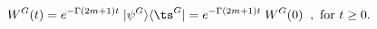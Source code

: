 \begin{equation}
W^G (t) = e^{-\Gamma (2m+1) t} \; |\psi^G \rangle \langle \ts^G | = 
	e^{-\Gamma (2m+1) t}\;  W^G (0) \;\; , \textrm{ for} \,\,t\ge 0.
\label{eq:densitymatrix}
\end{equation}


